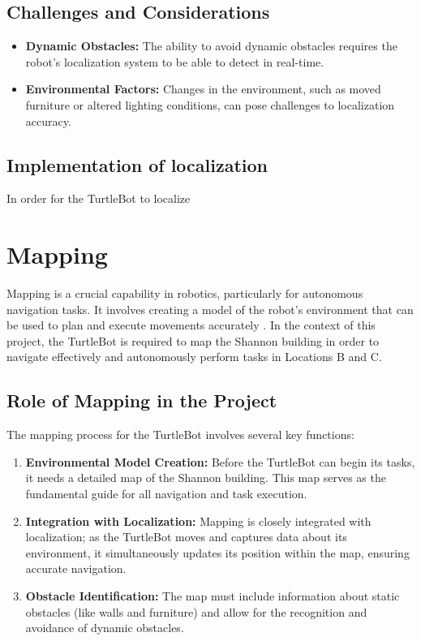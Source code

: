 \documentclass{article}
\begin{document}
	\subsection{Challenges and Considerations}
	\begin{itemize}
		\item \textbf{Dynamic Obstacles:} The ability to avoid dynamic obstacles requires the robot's localization system to be able to detect in real-time.
		\item \textbf{Environmental Factors:} Changes in the environment, such as moved furniture or altered lighting conditions, can pose challenges to localization accuracy.
	\end{itemize}
	\subsection{Implementation of localization}
	In order  for the TurtleBot to localize 
	\clearpage
	\section{Mapping}
	Mapping is a crucial capability in robotics, particularly for autonomous navigation tasks. It involves creating a model of the robot's environment that can be used to plan and execute movements accurately \cite{corke2017}. In the context of this project, the TurtleBot is required to map the Shannon building in order to navigate effectively and autonomously perform tasks in Locations B and C.
	
	\subsection{Role of Mapping in the Project}
	The mapping process for the TurtleBot involves several key functions:
	\begin{enumerate}
		\item \textbf{Environmental Model Creation:} Before the TurtleBot can begin its tasks, it needs a detailed map of the Shannon building. This map serves as the fundamental guide for all navigation and task execution.
		\item \textbf{Integration with Localization:} Mapping is closely integrated with localization; as the TurtleBot moves and captures data about its environment, it simultaneously updates its position within the map, ensuring accurate navigation.
		\item \textbf{Obstacle Identification:} The map must include information about static obstacles (like walls and furniture) and allow for the recognition and avoidance of dynamic obstacles.
	\end{enumerate}
	
\end{document}
